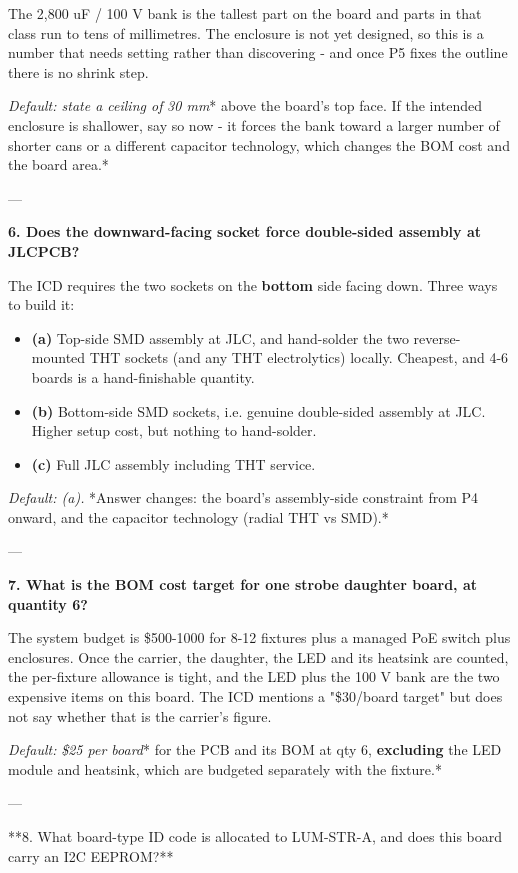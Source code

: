 \documentclass[11pt,a4paper]{article}
\begin{document}
The 2,800 uF / 100 V bank is the tallest part on the board and parts in that class run to tens of millimetres. The enclosure is not yet designed, so this is a number that needs setting rather than discovering - and once P5 fixes the outline there is no shrink step.

\emph{Default: state a ceiling of }\emph{30 mm}{*} above the board's top face. If the intended enclosure is shallower, say so now - it forces the bank toward a larger number of shorter cans or a different capacitor technology, which changes the BOM cost and the board area.{*}

---

\textbf{6. Does the downward-facing socket force double-sided assembly at JLCPCB?}

The ICD requires the two sockets on the \textbf{bottom} side facing down. Three ways to build it:

\begin{itemize}
\item \textbf{(a)} Top-side SMD assembly at JLC, and hand-solder the two reverse-mounted THT sockets
(and any THT electrolytics) locally. Cheapest, and 4-6 boards is a hand-finishable quantity.
\item \textbf{(b)} Bottom-side SMD sockets, i.e. genuine double-sided assembly at JLC. Higher setup
cost, but nothing to hand-solder.
\item \textbf{(c)} Full JLC assembly including THT service.
\end{itemize}
\emph{Default: (a).} {*}Answer changes: the board's assembly-side constraint from P4 onward, and the capacitor technology (radial THT vs SMD).{*}

---

\textbf{7. What is the BOM cost target for one strobe daughter board, at quantity 6?}

The system budget is \$500-1000 for 8-12 fixtures plus a managed PoE switch plus enclosures. Once the carrier, the daughter, the LED and its heatsink are counted, the per-fixture allowance is tight, and the LED plus the 100 V bank are the two expensive items on this board. The ICD mentions a "\$30/board target" but does not say whether that is the carrier's figure.

\emph{Default: }\emph{\$25 per board}{*} for the PCB and its BOM at qty 6, \textbf{excluding} the LED module and heatsink, which are budgeted separately with the fixture.{*}

---

{*}{*}8. What board-type ID code is allocated to LUM-STR-A, and does this board carry an I2C EEPROM?{*}{*}
\end{document}
